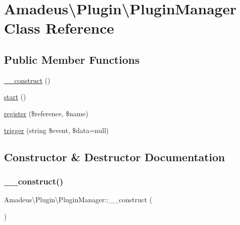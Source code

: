\hypertarget{classAmadeus_1_1Plugin_1_1PluginManager}{}\section{Amadeus\textbackslash{}Plugin\textbackslash{}Plugin\+Manager Class Reference}
\label{classAmadeus_1_1Plugin_1_1PluginManager}
\subsection*{Public Member Functions}
\begin{DoxyCompactItemize}
\item 
\hyperlink{classAmadeus_1_1Plugin_1_1PluginManager_a9442ae4737829be7eafe88c305354c44}{\+\_\+\+\_\+construct} ()
\item 
\hyperlink{classAmadeus_1_1Plugin_1_1PluginManager_a93164584ff284c3ab702320fd33101d5}{start} ()
\item 
\hyperlink{classAmadeus_1_1Plugin_1_1PluginManager_ae379fe4637a82326105a58144610daa6}{register} (\$reference, \$name)
\item 
\hyperlink{classAmadeus_1_1Plugin_1_1PluginManager_aac254ba855c612dbfdb47ec2699761f6}{trigger} (string \$event, \$data=null)
\end{DoxyCompactItemize}


\subsection{Constructor \& Destructor Documentation}
\mbox{\label{classAmadeus_1_1Plugin_1_1PluginManager_a9442ae4737829be7eafe88c305354c44}} 
\subsubsection{\texorpdfstring{\+\_\+\+\_\+construct()}{\_\_construct()}}
{\footnotesize\ttfamily Amadeus\textbackslash{}\+Plugin\textbackslash{}\+Plugin\+Manager\+::\+\_\+\+\_\+construct (\begin{DoxyParamCaption}{ }\end{DoxyParamCaption})}

